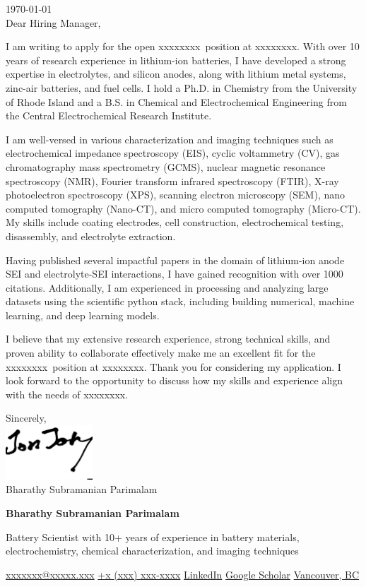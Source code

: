 \documentclass[11pt]{article}
\makeatletter
\newcommand{\coverletter}[1]{\setstretch{1.3} \vfill \large \hfill \today \\ \vfill \noindent#1 \vfill \newpage \setstretch{1}}
\def\signature{\includegraphics[height=0.8in]{signature.png}\\ [-30pt]}
\newcommand{\name}[1]{\begin{center}\Huge\textbf{#1}\end{center}}
\newcommand{\tagline}[0]{\begin{center}\large\vspace{-0.8em}\taglinecontent\end{center}}
\def\googlescholar{\href{https://scholar.google.com/citations?user=\scholar&hl=en}{Google Scholar}}
\newcommand{\contact}[0]{
    \vspace{-0.8em} \noindent \small
    \href{mailto:\email}{\email}
    \hfill
    \href{tel:\phonenumber}{\phoneformat}
    \hfill
    \href{https://www.linkedin.com/in/\linkedin/}{LinkedIn}
    \hfill
    \googlescholar
    \hfill
    \href{https://www.google.com/maps/place/\location}{\location}
}
\newcommand{\highlight}[1]{{\semibold#1}}
\def\hiringmanager{Hiring Manager}
\def\position{{xxxxxxxx}}
\def\company{{xxxxxxxx}}
\def\taglinecontent{Battery Scientist with 10+ years of experience in battery materials, electrochemistry, chemical characterization, and imaging techniques}
\def\email{{xxxxxxx@xxxxx.xxx}}
\def\phonenumber{{xxxxxxxxxx}}
\def\phoneformat{{+x (xxx) xxx-xxxx}}
\def\linkedin{bsparimalam}
\def\scholar{e3C7Q28AAAAJ}
\def\location{Vancouver, BC}
\makeatother
\begin{document}
\coverletter{Dear \hiringmanager,

I am writing to apply for the open \position\ position at \company. With \highlight{over 10 years of research experience} in \highlight{lithium-ion batteries}, I have developed a strong expertise in \highlight{electrolytes}, and \highlight{silicon anodes}, along with \highlight{lithium metal systems, zinc-air batteries}, and \highlight{fuel cells}. I hold a \highlight{Ph.D. in Chemistry} from the University of Rhode Island and a \highlight{B.S. in Chemical and Electrochemical Engineering} from the Central Electrochemical Research Institute.

I am well-versed in various characterization and imaging techniques such as electrochemical impedance spectroscopy \highlight{(EIS)}, cyclic voltammetry \highlight{(CV)}, gas chromatography mass spectrometry \highlight{(GCMS)}, nuclear magnetic resonance spectroscopy \highlight{(NMR)}, Fourier transform infrared spectroscopy \highlight{(FTIR)}, X-ray photoelectron spectroscopy \highlight{(XPS)}, scanning electron microscopy \highlight{(SEM)}, nano computed tomography \highlight{(Nano-CT)}, and micro computed tomography \highlight{(Micro-CT)}. My skills include \highlight{coating electrodes, cell construction, electrochemical testing, disassembly}, and \highlight{electrolyte extraction}.

Having \highlight{published several impactful papers} in the domain of \highlight{lithium-ion anode SEI and electrolyte-SEI interactions}, I have gained recognition with \highlight{over 1000 citations}. Additionally, I am experienced in processing and analyzing large datasets using the \highlight{scientific python stack}, including \highlight{building numerical, machine learning}, and \highlight{deep learning models}.

I believe that my extensive research experience, strong technical skills, and proven ability to collaborate effectively make me an excellent fit for the \position\ position at \company. Thank you for considering my application. I look forward to the opportunity to discuss how my skills and experience align with the needs of \company.

\noindent Sincerely,\\
\signature
Bharathy Subramanian Parimalam}
\name
    {Bharathy Subramanian Parimalam}

\tagline

\contact
\end{document}
